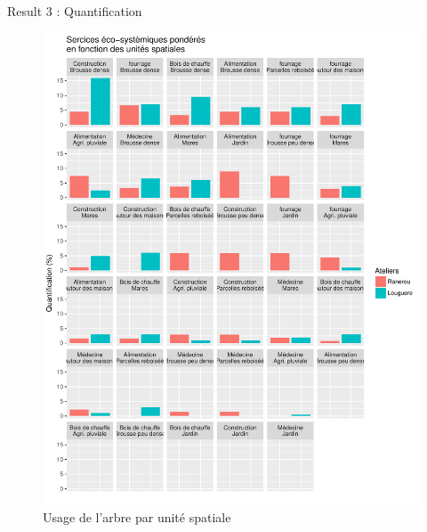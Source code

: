 \documentclass[newPxFont]{beamer}
\begin{document}
\begin{frame}[c]{Result 3 : Quantification}
\vspace{-1cm}
\begin{figure}
  \centering
  \includegraphics[width = \textwidth]{img/papier-figBar2}
  \caption{Usage de l'arbre par unité spatiale}
\end{figure}

\end{frame}
\end{document}
